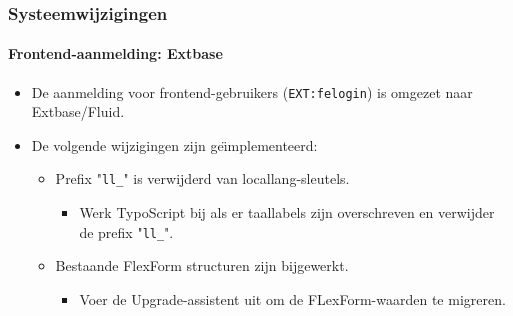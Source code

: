 
\begin{frame}[fragile]
	\frametitle{Systeemwijzigingen}
	\framesubtitle{Frontend-aanmelding: Extbase}

	\begin{itemize}
		\item De aanmelding voor frontend-gebruikers (\texttt{EXT:felogin}) is omgezet naar Extbase/Fluid.

		\item De volgende wijzigingen zijn ge\"{\i}mplementeerd:

		\begin{itemize}
			\item[\ding{202}] Prefix "\texttt{ll\_}" is verwijderd van locallang-sleutels.

				\begin{itemize}
					\item[\ding{228}] Werk TypoScript bij als er taallabels zijn overschreven en verwijder de prefix "\texttt{ll\_}".
				\end{itemize}

			\item[\ding{203}] Bestaande FlexForm structuren zijn bijgewerkt.

				\begin{itemize}
					\item[\ding{228}] Voer de Upgrade-assistent uit om de FLexForm-waarden te migreren.
				\end{itemize}

		\end{itemize}

	\end{itemize}

\end{frame}


